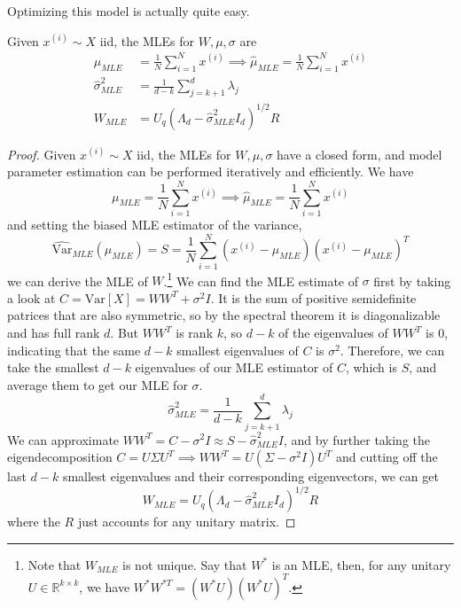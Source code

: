 \documentclass{article}
\begin{document}
  Optimizing this model is actually quite easy. 

  \begin{theorem}
    Given $x^{(i)} \sim X$ iid, the MLEs for $W, \mu, \sigma$ are 
    \begin{align}
      \mu_{MLE} & = \frac{1}{N} \sum_{i=1}^N x^{(i)} \implies \hat{\mu}_{MLE} = \frac{1}{N} \sum_{i=1}^N x^{(i)} \\ 
      \hat{\sigma}^2_{MLE} & = \frac{1}{d-k} \sum_{j=k+1}^d \lambda_j \\
      W_{MLE} & = U_q (\Lambda_d - \hat{\sigma}_{MLE}^2 I_d )^{1/2} R
    \end{align}
  \end{theorem}
  \begin{proof}
    Given $x^{(i)} \sim X$ iid, the MLEs for $W, \mu, \sigma$ have a closed form, and model parameter estimation can be performed iteratively and efficiently. We have 
    \begin{equation}
      \mu_{MLE} = \frac{1}{N} \sum_{i=1}^N x^{(i)} \implies \hat{\mu}_{MLE} = \frac{1}{N} \sum_{i=1}^N x^{(i)}
    \end{equation}
    and setting the biased MLE estimator of the variance, 
    \begin{equation}
      \widehat{\mathrm{Var}}_{MLE}(\mu_{MLE}) = S = \frac{1}{N} \sum_{i=1}^N (x^{(i)} - \mu_{MLE}) (x^{(i)} - \mu_{MLE})^T
    \end{equation}
    we can derive the MLE of $W$.\footnote{Note that $W_{MLE}$ is not unique. Say that $W^\ast$ is an MLE, then, for any unitary $U \in \mathbb{R}^{k \times k}$, we have $W^\ast W^{\ast T} = (W^\ast U) (W^\ast U)^T$.} We can find the MLE estimate of $\sigma$ first by taking a look at $C = \mathrm{Var}[X] = W W^T + \sigma^2 I$. It is the sum of positive semidefinite patrices that are also symmetric, so by the spectral theorem it is diagonalizable and has full rank $d$. But $W W^T$ is rank $k$, so $d - k$ of the eigenvalues of $W W^T$ is $0$, indicating that the same $d-k$ smallest eigenvalues of $C$ is $\sigma^2$. Therefore, we can take the smallest $d-k$ eigenvalues of our MLE estimator of $C$, which is $S$, and average them to get our MLE for $\sigma$. 
    \begin{equation}
      \hat{\sigma}^2_{MLE} = \frac{1}{d-k} \sum_{j=k+1}^d \lambda_j
    \end{equation}
    We can approximate $W W^T = C - \sigma^2 I \approx S - \hat{\sigma}^2_{MLE} I$, and by further taking the eigendecomposition $C = U \Sigma U^T \implies W W^T = U (\Sigma - \sigma^2 I) U^T$ and cutting off the last $d-k$ smallest eigenvalues and their corresponding eigenvectors, we can get 
    \begin{equation}
      W_{MLE} = U_q (\Lambda_d - \hat{\sigma}_{MLE}^2 I_d )^{1/2} R
    \end{equation}
    where the $R$ just accounts for any unitary matrix. 
  \end{proof}
\end{document}
